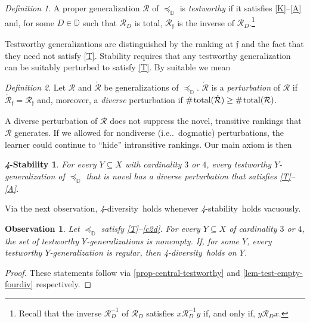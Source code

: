 \documentclass[ecta,nameyear,draft]{econsocart}
\makeatletter
\newcommand{\countof}{\mathbin{\#}\hskip1pt}
\newcommand{\mc}{\mathcal}
\newcommand{\novel}{\mathfrak f}
\newcommand{\preceqb}{\mathbin{\preceq}}
\newcommand{\ext}{\mathrel{\mc R}}
\newcommand{\extb}{\mathbin{\mc R}}
\newcommand{\hextb}{\mathbin{\hat{\mathbin{\mathcal R}}}}
\newcommand{\aext}{\mathrel{\acute{\mathrel{\mathcal R}}}}
\newcommand{\aextb}{\mathbin{\acute{\mathbin{\mathcal R}}}}
\newcommand{\total}{\textup{total}}
\newcommand{\mbbd}{{\mathds D}}
\newcommand{\stability}{\textit{4}-\textup{{stability}}}
\newcommand{\fourdiv}{\textit{4}-\textup{diversity}}
\newcommand\ie{i\@.e\@ifnextchar.{}{.\@}}
\theoremstyle{plain}
\newtheorem{observation}{Observation}
\newtheorem*{stability*}{\textit{4}-Stability}
\theoremstyle{remark}
\newtheorem*{definition*}{Definition}
\makeatother
\begin{document}
\begin{definition*}\label{def-testworthy}
  A proper generalization $\ext$ of $\preceqb_{\mbbd}$ is \emph{testworthy}
  if it satisfies \textup{\ref{K}--\ref{A}} and, for some $D\in \mbbd$ such
  that $\ext_{D}$ is total, $\extb _{\novel}$ is the inverse of
  $\extb_{D}$.\footnote{Recall that the inverse $\ext _{D}^{- 1}$ of $\ext
  _{D}$ satisfies $x \ext _{D}^{- 1} y$ if, and only if, $y \ext _{D}
  x$.}
\end{definition*}
Testworthy generalizations are distinguished by the ranking at $\novel$ and
the fact that they need not satisfy \ref{T}.  Stability requires that any
testworthy generalization can be suitably perturbed to satisfy \ref{T}. By
suitable we mean
\begin{definition*} Let $\ext$ and $\aext$ be generalizations of
  $\preceqb_{\mbbd}$. $\aext$ is a \emph{perturbation} of $\ext$ if
  $\aextb_{\novel} = \extb_{\novel}$ and, moreover, a \emph{{{diverse}}}
  perturbation if $\countof \total (\aextb) \geq \countof \total ( \extb)$.
\end{definition*}
A diverse perturbation of $\ext$ does not suppress the novel, transitive
rankings that $\ext$ generates. If we allowed for nondiverse (\ie\ dogmatic)
perturbations, the learner could continue to ``hide'' intransitive rankings.
Our main axiom is then
\begin{stability*}\label{P}
  For every $Y\subseteq X$ with cardinality $3$ or $4$, every testworthy
  $Y$-generalization of $\preceqb _{\mbbd}$ that is novel has a {{diverse}}
  perturbation that satisfies \ref{T}–\ref{A}.
\end{stability*}
Via the next observation, \fourdiv\ holds whenever \stability\ holds vacuously.
\begin{observation} \label{obs-testworthy}
  Let $\preceq_{\mbbd}$ satisfy \ref{T}–\ref{c2d}. For
  every $Y\subseteq X$ of cardinality $3$ or $4$, the set of testworthy
  $Y$-generalizations is nonempty. If, for some $Y$, every testworthy
  $Y$-generalization is regular, then \fourdiv\ holds on $Y$.
\end{observation}
\begin{proof}\label{proof-obs-testworthy}
  These statements follow via \cref{prop-central-testworthy}
  and \cref{lem-test-empty-fourdiv} respectively.
\end{proof}
\end{document}
